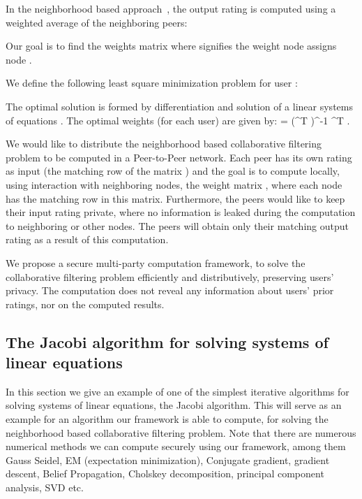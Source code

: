 \documentclass[10pt]{svjour3}
\begin{document}
In the neighborhood based approach~\cite{KorenCF}, the output
rating is computed using a weighted average of the neighboring
peers:

Our goal is to find the weights matrix  where 
signifies the weight node  assigns node .

We define the following least square minimization problem for user
 :


The optimal solution is formed by differentiation and solution of
a linear systems of equations . The optimal weights
(for each user) are given by: \BE \label{eqw} \vw = (\mR^T
\mR)^{-1} \mR^T \vb\;. \EE

We would like to distribute the neighborhood based collaborative
filtering problem to be computed in a Peer-to-Peer network. Each
peer has its own rating as input (the matching row of the matrix
) and the goal is to compute locally, using interaction with
neighboring nodes, the weight matrix , where each node has
the matching row in this matrix. Furthermore, the peers would like
to keep their input rating private, where no information is leaked
during the computation to neighboring or other nodes. The peers
will obtain only their matching output rating as a result of this
computation.

We propose a secure multi-party computation framework, to solve the
collaborative filtering problem efficiently and distributively,
preserving users' privacy. The computation does not reveal any
information about users' prior ratings, nor on the computed
results.

\subsection{The Jacobi algorithm for solving systems of
linear equations}\label{Jacobi} In this section we give an example
of one of the simplest iterative algorithms for solving systems of
linear equations, the Jacobi algorithm. This will serve as an
example for an algorithm our framework is able to compute, for
solving the neighborhood based collaborative filtering problem.
Note that there are numerous numerical methods we can compute
securely using our framework, among them Gauss Seidel, EM
(expectation minimization), Conjugate gradient, gradient descent,
Belief Propagation, Cholskey decomposition, principal component
analysis, SVD etc.
\end{document}
